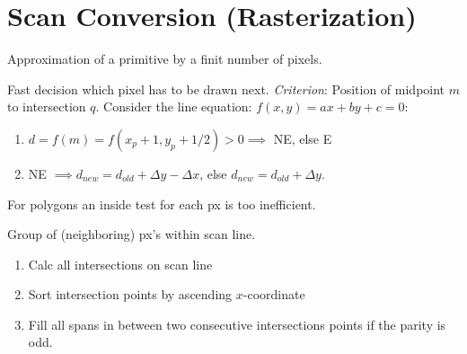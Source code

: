 \section{Scan Conversion (Rasterization)}

Approximation of a primitive by a finit number of pixels.

\begin{algorithm}
  Fast decision which pixel has to be drawn next.
  \textit{Criterion}: Position of midpoint \(m\) to intersection \(q\).
  Consider the line equation: \(f(x, y) = ax + by + c = 0\): 

  \begin{enumerate}
    \item \(d = f(m) = f(x_p + 1, y_p + 1/2) > 0 \implies\) NE, else E
    \item NE \(\implies d_{new} = d_{old} + \Delta y - \Delta x\), else \(d_{new} = d_{old}+ \Delta y\).
  \end{enumerate}
\end{algorithm}

\begin{theorem}
  For polygons an inside test for each px is too inefficient.
\end{theorem}

\begin{definition}
  Group of (neighboring) px's within scan line.
\end{definition}

\begin{algorithm}[SC of Polygons]
  \begin{enumerate}
    \item Calc all intersections on scan line
    \item Sort intersection points by ascending \(x\)-coordinate
    \item Fill all spans in between two consecutive intersections points if the parity is odd.
  \end{enumerate}
\end{algorithm}
